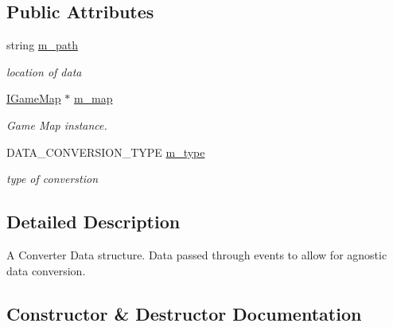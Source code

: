 \subsection*{Public Attributes}
\begin{DoxyCompactItemize}
\item 
\hypertarget{struct_converter_data_a625a998ca2bbc27fd7479df743785aa9}{}string \hyperlink{struct_converter_data_a625a998ca2bbc27fd7479df743785aa9}{m\+\_\+path}\label{struct_converter_data_a625a998ca2bbc27fd7479df743785aa9}

\begin{DoxyCompactList}\small\item\em location of data \end{DoxyCompactList}\item 
\hypertarget{struct_converter_data_a69f0e36c8095177f94f26f810b57c4e6}{}\hyperlink{class_i_game_map}{I\+Game\+Map} $\ast$ \hyperlink{struct_converter_data_a69f0e36c8095177f94f26f810b57c4e6}{m\+\_\+map}\label{struct_converter_data_a69f0e36c8095177f94f26f810b57c4e6}

\begin{DoxyCompactList}\small\item\em Game Map instance. \end{DoxyCompactList}\item 
\hypertarget{struct_converter_data_a3fa88946f971554e3b7fbe945808acb5}{}D\+A\+T\+A\+\_\+\+C\+O\+N\+V\+E\+R\+S\+I\+O\+N\+\_\+\+T\+Y\+P\+E \hyperlink{struct_converter_data_a3fa88946f971554e3b7fbe945808acb5}{m\+\_\+type}\label{struct_converter_data_a3fa88946f971554e3b7fbe945808acb5}

\begin{DoxyCompactList}\small\item\em type of converstion \end{DoxyCompactList}\end{DoxyCompactItemize}


\subsection{Detailed Description}
A Converter Data structure. Data passed through events to allow for agnostic data conversion. 

\subsection{Constructor \& Destructor Documentation}
\hypertarget{struct_converter_data_a211499bf857868ac838af4848d8f509d}{}
